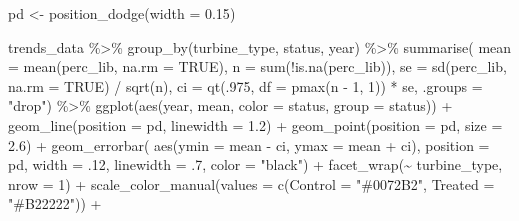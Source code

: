 \documentclass[
  letterpaper,
  DIV=11,
  numbers=noendperiod]{scrartcl}
\newenvironment{Shaded}{\begin{snugshade}}{\end{snugshade}}
\newcommand{\AttributeTok}[1]{\textcolor[rgb]{0.40,0.45,0.13}{#1}}
\newcommand{\ConstantTok}[1]{\textcolor[rgb]{0.56,0.35,0.01}{#1}}
\newcommand{\DecValTok}[1]{\textcolor[rgb]{0.68,0.00,0.00}{#1}}
\newcommand{\FloatTok}[1]{\textcolor[rgb]{0.68,0.00,0.00}{#1}}
\newcommand{\FunctionTok}[1]{\textcolor[rgb]{0.28,0.35,0.67}{#1}}
\newcommand{\NormalTok}[1]{\textcolor[rgb]{0.00,0.23,0.31}{#1}}
\newcommand{\OtherTok}[1]{\textcolor[rgb]{0.00,0.23,0.31}{#1}}
\newcommand{\SpecialCharTok}[1]{\textcolor[rgb]{0.37,0.37,0.37}{#1}}
\newcommand{\StringTok}[1]{\textcolor[rgb]{0.13,0.47,0.30}{#1}}
\begin{document}
\begin{Shaded}
\begin{Highlighting}[]
\NormalTok{pd }\OtherTok{\textless{}{-}} \FunctionTok{position\_dodge}\NormalTok{(}\AttributeTok{width =} \FloatTok{0.15}\NormalTok{)}

\NormalTok{trends\_data }\SpecialCharTok{\%\textgreater{}\%}
  \FunctionTok{group\_by}\NormalTok{(turbine\_type, status, year) }\SpecialCharTok{\%\textgreater{}\%}
  \FunctionTok{summarise}\NormalTok{(}
    \AttributeTok{mean =} \FunctionTok{mean}\NormalTok{(perc\_lib, }\AttributeTok{na.rm =} \ConstantTok{TRUE}\NormalTok{),}
    \AttributeTok{n    =} \FunctionTok{sum}\NormalTok{(}\SpecialCharTok{!}\FunctionTok{is.na}\NormalTok{(perc\_lib)),}
    \AttributeTok{se   =} \FunctionTok{sd}\NormalTok{(perc\_lib, }\AttributeTok{na.rm =} \ConstantTok{TRUE}\NormalTok{) }\SpecialCharTok{/} \FunctionTok{sqrt}\NormalTok{(n), }
    \AttributeTok{ci   =} \FunctionTok{qt}\NormalTok{(.}\DecValTok{975}\NormalTok{, }\AttributeTok{df =} \FunctionTok{pmax}\NormalTok{(n }\SpecialCharTok{{-}} \DecValTok{1}\NormalTok{, }\DecValTok{1}\NormalTok{)) }\SpecialCharTok{*}\NormalTok{ se,}
    \AttributeTok{.groups =} \StringTok{"drop"}\NormalTok{) }\SpecialCharTok{\%\textgreater{}\%}
\FunctionTok{ggplot}\NormalTok{(}\FunctionTok{aes}\NormalTok{(year, mean, }\AttributeTok{color =}\NormalTok{ status, }\AttributeTok{group =}\NormalTok{ status)) }\SpecialCharTok{+}
  \FunctionTok{geom\_line}\NormalTok{(}\AttributeTok{position =}\NormalTok{ pd, }\AttributeTok{linewidth =} \FloatTok{1.2}\NormalTok{) }\SpecialCharTok{+}
  \FunctionTok{geom\_point}\NormalTok{(}\AttributeTok{position =}\NormalTok{ pd, }\AttributeTok{size =} \FloatTok{2.6}\NormalTok{) }\SpecialCharTok{+}
  \FunctionTok{geom\_errorbar}\NormalTok{(}
    \FunctionTok{aes}\NormalTok{(}\AttributeTok{ymin =}\NormalTok{ mean }\SpecialCharTok{{-}}\NormalTok{ ci, }\AttributeTok{ymax =}\NormalTok{ mean }\SpecialCharTok{+}\NormalTok{ ci),}
    \AttributeTok{position =}\NormalTok{ pd, }\AttributeTok{width =}\NormalTok{ .}\DecValTok{12}\NormalTok{, }\AttributeTok{linewidth =}\NormalTok{ .}\DecValTok{7}\NormalTok{, }\AttributeTok{color =} \StringTok{"black"}\NormalTok{) }\SpecialCharTok{+}
  \FunctionTok{facet\_wrap}\NormalTok{(}\SpecialCharTok{\textasciitilde{}}\NormalTok{ turbine\_type, }\AttributeTok{nrow =} \DecValTok{1}\NormalTok{) }\SpecialCharTok{+}
  \FunctionTok{scale\_color\_manual}\NormalTok{(}\AttributeTok{values =} \FunctionTok{c}\NormalTok{(}\AttributeTok{Control =} \StringTok{"\#0072B2"}\NormalTok{, }\AttributeTok{Treated =} \StringTok{"\#B22222"}\NormalTok{)) }\SpecialCharTok{+}

\end{Highlighting}
\end{Shaded}
\end{document}
